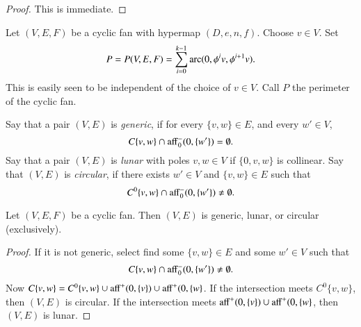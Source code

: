 \begin{proof}  This is immediate.
\end{proof}

\begin{definition}[perimeter]\label{lemma:mono}
Let $(V,E,F)$ be a cyclic fan with hypermap $(D,e,n,f)$.  Choose $v\in V$.  Set
$$
P=P(V,E,F) = \sum_{i=0}^{k-1} \operatorname{arc}(0,\phi^i v,\phi^{i+1} v).
$$
This is easily seen to be independent of the choice of $v\in V$.  Call $P$ the perimeter of the cyclic fan.
\end{definition}

\begin{definition}
Say that a pair $(V,E)$ is {\it generic}, if for every $\{v,w\}\in E$,
and every $w'\in V$, 
$$
C\{v,w\}\cap {\operatorname{aff}}_0^-(0,\{w'\}) = \emptyset.
$$
Say that a pair $(V,E)$ is {\it lunar} with poles $v,w\in V$ if $\{0,v,w\}$ is collinear.
Say that $(V,E)$ is {\it circular}, if there exists $w'\in V$ and $\{v,w\}\in E$ such that 
$$
C^0\{v,w\}\cap {\operatorname{aff}}_0^-(0,\{w'\})\ne \emptyset.
$$
\end{definition}

\begin{lemma} Let $(V,E,F)$ be a cyclic fan.  Then $(V,E)$ is
generic, lunar, or circular (exclusively).
\end{lemma}

\begin{proof} If it is not generic,  select find some $\{v,w\}\in E$
and some $w'\in V$ such that
$$
C\{v,w\}\cap {\operatorname{aff}}_0^-(0,\{w'\}) \ne \emptyset.
$$
Now $C\{v,w\} = C^0\{v,w\} \cup{\operatorname{aff}}^+(0,\{v\})\cup{\operatorname{aff}}^+(0,\{w\}$.  
If the intersection meets $C^0\{v,w\}$, then $(V,E)$ is circular.  
If the intersection meets ${\operatorname{aff}}^+(0,\{v\})\cup{\operatorname{aff}}^+(0,\{w\}$,
then $(V,E)$ is lunar. 
\end{proof}

